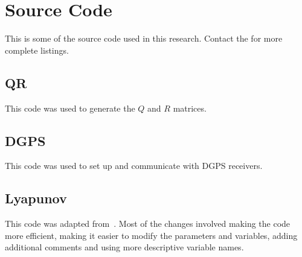 \chapter{Source Code}
\label{ch:code}
This is some of the source code used in this research. Contact the  for more complete listings.

\section{QR}
\label{sec:qrcode}
This code was used to generate the $Q$ and $R$ matrices.
\lstset{language=C++}

\clearpage
\section{DGPS}
\label{sec:dgpscode}
This code was used to set up and communicate with DGPS receivers.

\clearpage
\section{Lyapunov}
\label{sec:lyapunovcode}
This code was adapted from~\cite{Rusu05RobotuxLyapunov}. Most of the changes involved making the code more efficient, making it easier to modify the parameters and variables, adding additional comments and using more descriptive variable names.
\lstset{language=Matlab}
